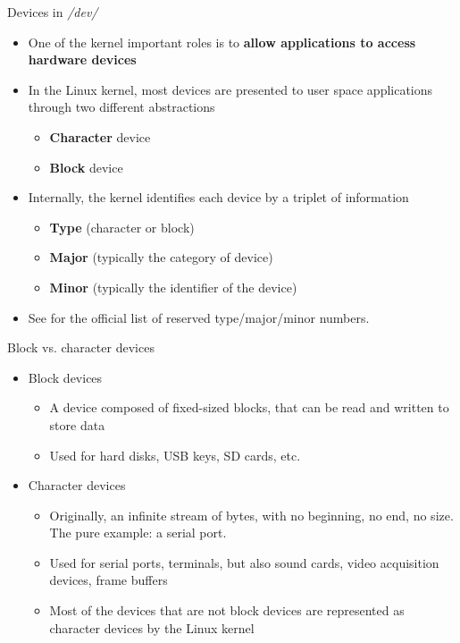 \begin{frame}{Devices in {\em /dev/}}
  \begin{itemize}
  \item One of the kernel important roles is to {\bf allow applications
      to access hardware devices}
  \item In the Linux kernel, most devices are presented to user space
    applications through two different abstractions
    \begin{itemize}
    \item {\bf Character} device
    \item {\bf Block} device
    \end{itemize}
  \item Internally, the kernel identifies each device by a triplet of
    information
    \begin{itemize}
    \item {\bf Type} (character or block)
    \item {\bf Major} (typically the category of device)
    \item {\bf Minor} (typically the identifier of the device)
    \end{itemize}
  \item See  for the
    official list of reserved type/major/minor numbers.
  \end{itemize}
\end{frame}

\begin{frame}{Block vs. character devices}
  \begin{itemize}
  \item Block devices
    \begin{itemize}
    \item A device composed of fixed-sized blocks, that can be read
      and written to store data
    \item Used for hard disks, USB keys, SD cards, etc.
    \end{itemize}
  \item Character devices
    \begin{itemize}
    \item Originally, an infinite stream of bytes, with no beginning,
      no end, no size. The pure example: a serial port.
    \item Used for serial ports, terminals, but also sound cards,
      video acquisition devices, frame buffers
    \item Most of the devices that are not block devices are
      represented as character devices by the Linux kernel
    \end{itemize}
  \end{itemize}
\end{frame}

